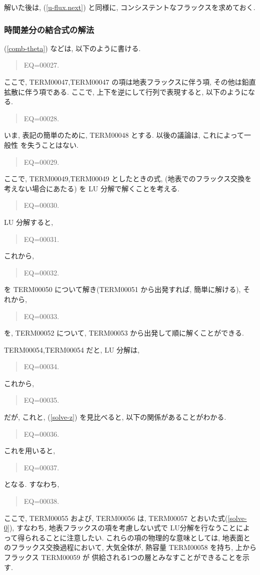 解いた後は, 
(\ref{u-flux.next}) と同様に,
コンシステントなフラックスを求めておく.

\subsubsection{時間差分の結合式の解法}

(\ref{comb-theta}) などは, 以下のように書ける.
%
\begin{quote}
EQ=00027.
\end{quote}
ここで, TERM00047,TERM00047
の項は地表フラックスに伴う項,
その他は鉛直拡散に伴う項である.
%
ここで, 上下を逆にして行列で表現すると, 以下のようになる.
%
\begin{quote}
EQ=00028.
\end{quote}

いま, 表記の簡単のために, TERM00048 とする.  以後の議論は, これによって一般性
を失うことはない.
%
\begin{quote}
EQ=00029.
\end{quote}
%
ここで,
TERM00049,TERM00049 としたときの式,
(地表でのフラックス交換を考えない場合にあたる)
を LU 分解で解くことを考える.
%
\begin{quote}
EQ=00030.
\label{solve-0}
\end{quote}

LU 分解すると,
%
\begin{quote}
EQ=00031.
\end{quote}
%
これから, 
%
\begin{quote}
EQ=00032.
\label{solve-z}
\end{quote}
%
を TERM00050 について解き(TERM00051 から出発すれば, 簡単に解ける), 
それから,
%
\begin{quote}
EQ=00033.
\end{quote}
%
を, TERM00052 について, TERM00053 から出発して順に解くことができる.

TERM00054,TERM00054 だと, LU 分解は, 
%
\begin{quote}
EQ=00034.
\end{quote}
%
これから, 
%
\begin{quote}
EQ=00035.
\end{quote}
%
だが, これと, (\ref{solve-z}) を見比べると, 以下の関係があることがわかる.
%
\begin{quote}
EQ=00036.
\end{quote}
%
これを用いると,
%
\begin{quote}
EQ=00037.
\label{solve-x}
\end{quote}
%
となる. すなわち,
%
\begin{quote}
EQ=00038.
\label{solve-1}
\end{quote}
%
ここで, TERM00055 および, TERM00056 は,
TERM00057 とおいた式(\ref{solve-0}),
すなわち, 地表フラックスの項を考慮しない式で
LU分解を行なうことによって得られることに注意したい.
これらの項の物理的な意味としては,
地表面とのフラックス交換過程において,
大気全体が, 熱容量 TERM00058 を持ち, 
上からフラックス TERM00059 が
供給される1つの層とみなすことができることを示す.


